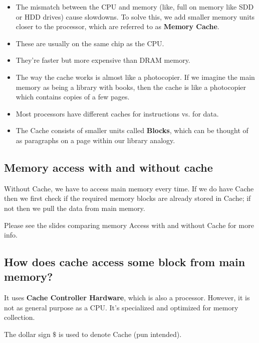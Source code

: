 \documentclass[11pt]{article}
\begin{document}
\begin{itemize}
  \item The mismatch between the CPU and memory (like, full on memory like SDD or HDD drives) cause slowdowns. To solve this, we add smaller memory units closer to the processor, which are referred to as \textbf{Memory Cache}.
  \item These are usually on the same chip as the CPU.
  \item They're faster but more expensive than DRAM memory.
  \item The way the cache works is almost like a photocopier. If we imagine the main memory as being a library with books, then the cache is like a photocopier which contains copies of a few pages.
  \item Most processors have different caches for instructions vs. for data.
  \item The Cache consists of smaller units called \textbf{Blocks}, which can be thought of as paragraphs on a page within our library analogy.
\end{itemize}


\subsection*{Memory access with and without cache}

Without Cache, we have to access main memory every time. If we do have Cache then we first check if the required memory blocks are already stored in Cache; if not then we pull the data from main memory.
\begin{note}
  {Please see the slides comparing memory Access with and without Cache for more info.}
\end{note}

\subsection{How does cache access some block from main memory?}
It uses \textbf{Cache Controller Hardware}, which is also a processor. However, it is not as general purpose as a CPU. It's specialized and optimized for memory collection.

\begin{bluebox}
  \begin{remark}
    {The dollar sign $ \$ $ is used to denote Cache (pun intended).}
  \end{remark}
\end{bluebox}
\end{document}
